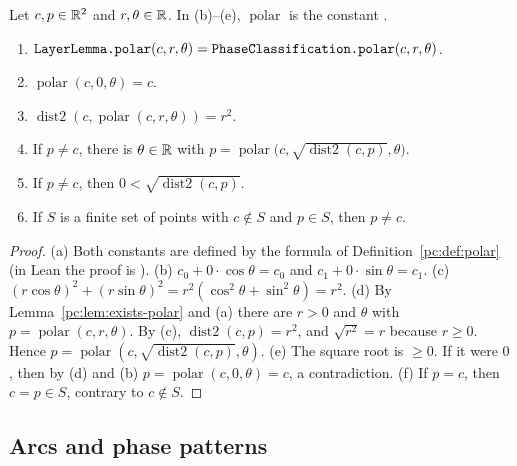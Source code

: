 \begin{lemma}\label{pc:lem:helpers}
Let $c,p\in\mathbb R^2$ and $r,\theta\in\mathbb R$. In \textup{(b)--(e)}, $\operatorname{polar}$ is the constant
.
\begin{enumerate}[label=(\alph*)]
\item $\text{\lean{LayerLemma.polar}}(c,r,\theta)=\text{\lean{PhaseClassification.polar}}(c,r,\theta)$.
\item $\operatorname{polar}(c,0,\theta)=c$.
\item $\operatorname{dist2}(c,\operatorname{polar}(c,r,\theta))=r^2$.
\item If $p\neq c$, there is $\theta\in\mathbb R$ with $p=\operatorname{polar}\bigl(c,\sqrt{\operatorname{dist2}(c,p)},\theta\bigr)$.
\item If $p\neq c$, then $0<\sqrt{\operatorname{dist2}(c,p)}$.
\item If $S$ is a finite set of points with $c\notin S$ and $p\in S$, then $p\neq c$.
\end{enumerate}
\end{lemma}

\begin{proof}
(a) Both constants are defined by the formula of Definition~\ref{pc:def:polar} (in Lean the proof is
). (b) $c_0+0\cdot\cos\theta=c_0$ and $c_1+0\cdot\sin\theta=c_1$.
(c) $(r\cos\theta)^2+(r\sin\theta)^2=r^2(\cos^2\theta+\sin^2\theta)=r^2$.
(d) By Lemma~\ref{pc:lem:exists-polar} and (a) there are $r>0$ and $\theta$ with $p=\operatorname{polar}(c,r,\theta)$.
By (c), $\operatorname{dist2}(c,p)=r^2$, and $\sqrt{r^2}=r$ because $r\ge0$. Hence
$p=\operatorname{polar}(c,\sqrt{\operatorname{dist2}(c,p)},\theta)$.
(e) The square root is $\ge0$. If it were $0$, then by (d) and (b) $p=\operatorname{polar}(c,0,\theta)=c$, a
contradiction.
(f) If $p=c$, then $c=p\in S$, contrary to $c\notin S$.
\end{proof}

\subsection{Arcs and phase patterns}

